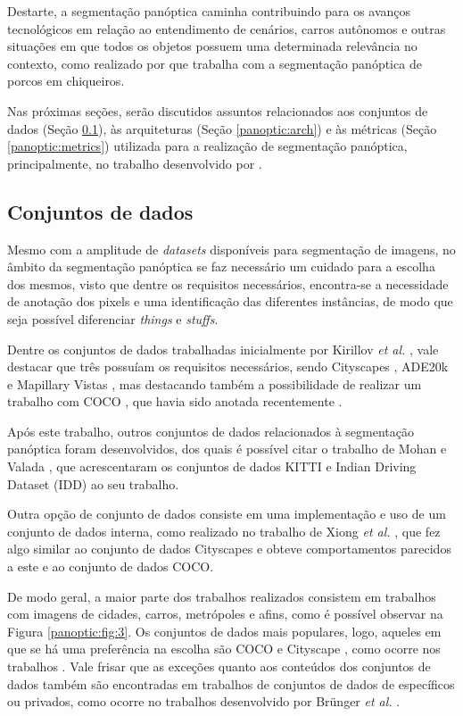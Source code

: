 Destarte, a segmentação panóptica caminha contribuindo para os avanços tecnológicos em relação ao entendimento de cenários, carros autônomos \cite{Liu2019} e outras situações em que todos os objetos possuem uma determinada relevância no contexto, como realizado por \cite{Brunger2020} que trabalha com a segmentação panóptica de porcos em chiqueiros.

Nas próximas seções, serão discutidos assuntos relacionados aos conjuntos de dados (Seção \ref{panoptic:dataset}), às arquiteturas (Seção \ref{panoptic:arch}) e às métricas (Seção \ref{panoptic:metrics}) utilizada para a realização de segmentação panóptica, principalmente, no trabalho desenvolvido por \cite{Kirillov2019a}.


\subsection{Conjuntos de dados}
\label{panoptic:dataset}
Mesmo com a amplitude de \textit{datasets} disponíveis para segmentação de imagens, no âmbito da segmentação panóptica se faz necessário um cuidado para a escolha dos mesmos, visto que dentre os requisitos necessários, encontra-se a necessidade de anotação dos pixels e uma identificação das diferentes instâncias, de modo que seja possível diferenciar \textit{things} e \textit{stuffs}.

Dentre os conjuntos de dados trabalhadas inicialmente por Kirillov \textit{et al.} \cite{Kirillov2019a}, vale destacar que três possuíam os requisitos necessários, sendo Cityscapes \cite{Cordts2016}, ADE20k \cite{Zhou2016} e Mapillary Vistas \cite{Neuhold2017_ICCV}, mas destacando também a possibilidade de realizar um trabalho com COCO \cite{Lin2014}, que havia sido anotada recentemente \cite{Kirillov2019a}.

Após este trabalho, outros conjuntos de dados relacionados à segmentação panóptica foram desenvolvidos, dos quais é possível citar o trabalho de Mohan e Valada \cite{Mohan2020}, que acrescentaram os conjuntos de dados KITTI \cite{Geiger2013} e Indian Driving Dataset (IDD) \cite{Varma2018} ao seu trabalho.

Outra opção de conjunto de dados consiste em uma implementação e uso de um conjunto de dados interna, como realizado no trabalho de Xiong \textit{et al.} \cite{Xiong2019}, que fez algo similar ao conjunto de dados Cityscapes e obteve comportamentos parecidos a este e ao conjunto de dados COCO.

De modo geral, a maior parte dos trabalhos realizados consistem em trabalhos com imagens de cidades, carros, metrópoles e afins, como é possível observar na Figura \ref{panoptic:fig:3}. Os conjuntos de dados mais populares, logo, aqueles em que se há uma preferência na escolha são COCO \cite{Caesar2016, Lin2014} e Cityscape \cite{Cordts2016}, como ocorre nos trabalhos \cite{Chen2019, DeGeus2019a, DeGeus2019, Hou2019, Liu2019, Xiong2019}. Vale frisar que as exceções quanto aos conteúdos dos conjuntos de dados também são encontradas em trabalhos de conjuntos de dados de específicos ou privados, como ocorre no trabalhos desenvolvido por Brünger \textit{et al.} \cite{Brunger2020}.

